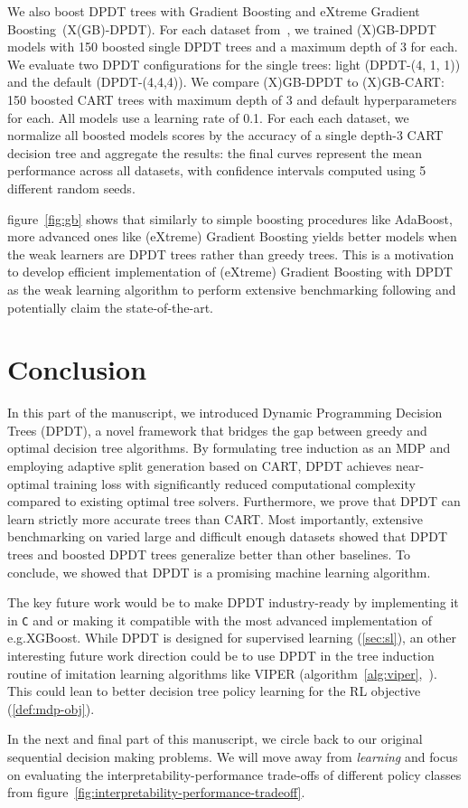 We also boost DPDT trees with Gradient Boosting and eXtreme Gradient Boosting~\cite{FriedmanBoosting,stcohFriedman,xgb}(X(GB)-DPDT). For each dataset from~\cite{grinsztajn2022tree}, we trained (X)GB-DPDT models with 150 boosted single DPDT trees and a maximum depth of 3 for each. We evaluate two DPDT configurations for the single trees: light (DPDT-(4, 1, 1)) and the default (DPDT-(4,4,4)). We compare (X)GB-DPDT to (X)GB-CART: 150 boosted CART trees with maximum depth of 3 and default hyperparameters for each. All models use a learning rate of 0.1. For each each dataset, we normalize all boosted models scores by the accuracy of a single depth-3 CART decision tree and aggregate the results: the final curves represent the mean performance across all datasets, with confidence intervals computed using 5 different random seeds.

figure~\ref{fig:gb} shows that similarly to simple boosting procedures like AdaBoost, more advanced ones like (eXtreme) Gradient Boosting yields better models when the weak learners are DPDT trees rather than greedy trees. This is a motivation to develop efficient implementation of (eXtreme) Gradient Boosting with DPDT as the weak learning algorithm to perform extensive benchmarking following \cite{grinsztajn2022tree} and potentially claim the state-of-the-art.



\section{Conclusion}\label{sec:ccl-dpdt}

In this part of the manuscript, we introduced Dynamic Programming Decision Trees (DPDT), a novel framework that bridges the gap between greedy and optimal decision tree algorithms. By formulating tree induction as an MDP and employing adaptive split generation based on CART, DPDT achieves near-optimal training loss with significantly reduced computational complexity compared to existing optimal tree solvers. Furthermore, we prove that DPDT can learn strictly more accurate trees than CART. 
Most importantly, extensive benchmarking on varied large and difficult enough datasets showed that DPDT trees and boosted DPDT trees generalize better than other baselines. To conclude, we showed that DPDT is a promising machine learning algorithm. 

The key future work would be to make DPDT industry-ready by implementing it in \texttt{C} and or making it compatible with the most advanced implementation of e.g.\@ XGBoost.
While DPDT is designed for supervised learning (\ref{sec:sl}), an other interesting future work direction could be to use DPDT in the tree induction routine of imitation learning algorithms like VIPER (algorithm~\ref{alg:viper},~\cite{viper}).
This could lean to better decision tree policy learning for the RL objective (\ref{def:mdp-obj}).

In the next and final part of this manuscript, we circle back to our original sequential decision making problems.
We will move away from \textit{learning} and focus on evaluating the interpretability-performance trade-offs of different policy classes from figure~\ref{fig:interpretability-performance-tradeoff}.
